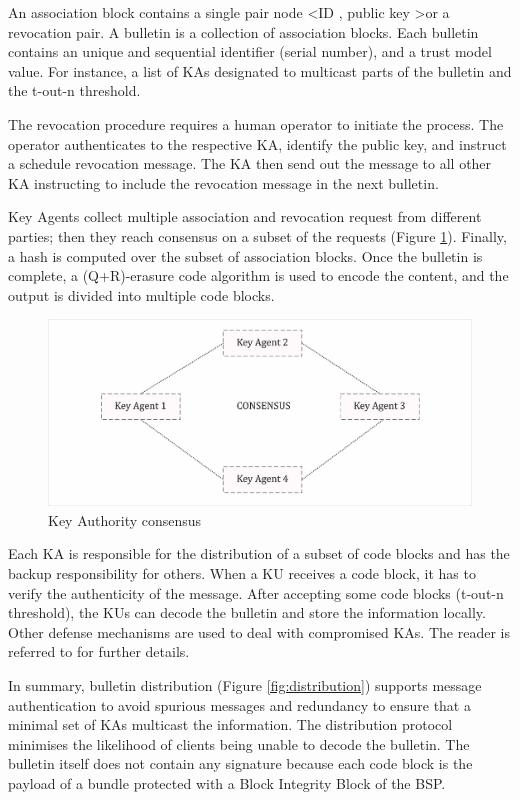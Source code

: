 An association block contains a single pair node \textless ID , public key \textgreater or a revocation pair. A bulletin is a collection of association blocks. Each bulletin contains an unique and sequential identifier (serial number), and a trust model value. For instance, a list of KAs designated to multicast parts of the bulletin and the t-out-n threshold.

The revocation procedure requires a human operator to initiate the process. The operator authenticates to the respective KA, identify the public key, and instruct a schedule revocation message. The KA then send out the message to all other KA instructing to include the revocation message in the next bulletin.   


Key Agents collect multiple association and revocation request from different parties; then they reach consensus on a subset of the requests (Figure \ref{fig:consensus}). Finally, a hash is computed over the subset of association blocks. Once the bulletin is complete, a (Q+R)-erasure code algorithm is used to encode the content, and the output is divided into multiple code blocks. 

\begin{figure}[htb]
\centering
\includegraphics[width=1 \linewidth]{images/consensus.png} 
\caption{Key Authority consensus}
\label{fig:consensus}
\end{figure}


Each KA is responsible for the distribution of a subset of code blocks and has the backup responsibility for others. When a KU receives a code block, it has to verify the authenticity of the message. After accepting some code blocks (t-out-n threshold), the KUs can decode the bulletin and store the information locally. Other defense mechanisms are used to deal with compromised KAs. The reader is referred to \cite{burleigh-dtnwg-dtka-01} for further details.


In summary, bulletin distribution (Figure \ref{fig:distribution}) supports message authentication to avoid spurious messages and redundancy to ensure that a minimal set of KAs multicast the information. The distribution protocol minimises the likelihood of clients being unable to decode the bulletin. The bulletin itself does not contain any signature because each code block is the payload of a bundle protected with a Block Integrity Block of the BSP.

